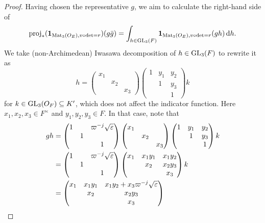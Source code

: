 \begin{proof}
  Having chosen the representative $g$, we aim to calculate the right-hand side of
  \[
    \rproj_\ast(\mathbf{1}_{\Mat_3(\OO_E), v\circ\det=r})(g\bar{g})
    = \int_{h \in \GL_3(F)} \mathbf{1}_{\Mat_3(\OO_E), v\circ\det=r}(gh) \odif h.
  \]
  We take (non-Archimedean) Iwasawa decomposition of $h \in \operatorname{GL}_3(F)$ to rewrite it as
  \[
    h =
    \begin{pmatrix} x_1 \\ & x_2 \\ && x_3 \end{pmatrix}
    \begin{pmatrix} 1 & y_1 & y_2 \\ & 1 & y_3 \\ & & 1 \end{pmatrix}
    k
  \]
  for $k \in \operatorname{GL}_3(O_F) \subseteq K'$, which does not affect the indicator function.
  Here $x_1, x_2, x_3 \in F^\times$ and $y_1, y_2, y_3 \in F$.
  In that case, note that
  \begin{align*}
    gh
    &=
    \begin{pmatrix}
      1 &   & \varpi^{-j}\sqrt{\varepsilon} \\
      & 1 \\
      &   & 1
    \end{pmatrix}
    \begin{pmatrix} x_1 \\ & x_2 \\ && x_3 \end{pmatrix}
    \begin{pmatrix} 1 & y_1 & y_2 \\ & 1 & y_3 \\ & & 1 \end{pmatrix} k \\
    &=
    \begin{pmatrix}
      1 &   & \varpi^{-j}\sqrt{\varepsilon} \\
      & 1 \\
      &   & 1
    \end{pmatrix}
    \begin{pmatrix} x_1 & x_1 y_1 & x_1 y_2 \\ & x_2 & x_2 y_3 \\ & & x_3 \end{pmatrix} k \\
    &=
    \begin{pmatrix}
      x_1 & x_1 y_1 & x_1 y_2 + x_3 \varpi^{-j} \sqrt{\varepsilon} \\
      & x_2 & x_2 y_3 \\
      & & x_3

\end{pmatrix}
\end{align*}
\end{proof}
